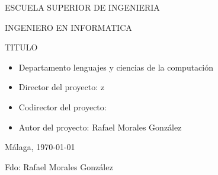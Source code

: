 

\begin{center}

 

  \vspace{2.0cm}

  \Large{ESCUELA SUPERIOR DE INGENIERIA} \\

  \vspace{1.0cm}

  \large{INGENIERO EN INFORMATICA } \\

  \vspace{1.0cm}

  \large{TITULO} \\

  \vspace{1.0cm}

\end{center}

\begin{itemize}
\item \large{Departamento lenguajes y ciencias de la computaci\'on}
\item \large{Director del proyecto: z}
\item \large{Codirector del proyecto: }
\item \large{Autor del proyecto: Rafael Morales Gonz\'alez}
\end{itemize}

\vspace{1.0cm}

\begin{flushright}
  \large{M\'alaga, \today} \\

  \vspace{2.5cm}

  \large{Fdo: Rafael Morales Gonz\'alez}
\end{flushright}
